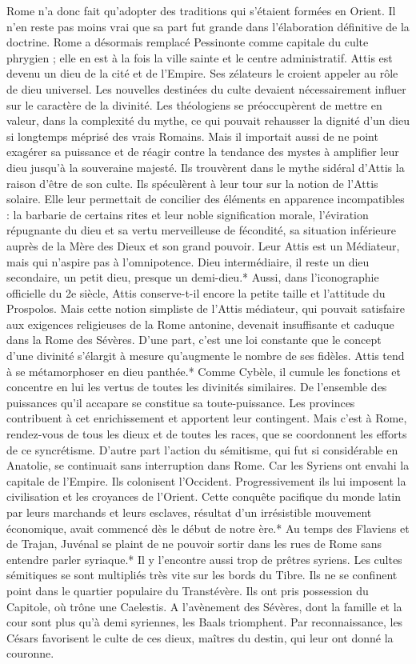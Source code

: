 \documentclass[a4paper, 11pt, oneside, polutonikogreek, french]{article}
\begin{document}
Rome n'a donc fait qu'adopter des traditions qui s'étaient formées en Orient. Il n'en reste pas moins vrai que sa part fut grande dans l'élaboration définitive de la doctrine. Rome a désormais remplacé Pessinonte comme capitale du culte phrygien ; elle en est à la fois la ville sainte et le centre administratif. Attis est devenu un dieu de la cité et de l'Empire. Ses zélateurs le croient appeler au rôle de dieu universel. Les nouvelles destinées du culte devaient nécessairement influer sur le caractère de la divinité. Les théologiens se préoccupèrent de mettre en valeur, dans la complexité du mythe, ce qui pouvait rehausser la dignité d'un dieu si longtemps méprisé des vrais Romains. Mais il importait aussi de ne point exagérer sa puissance et de réagir contre la tendance des mystes à amplifier leur dieu jusqu'à la souveraine majesté. Ils trouvèrent dans le mythe sidéral d'Attis la raison d'être de son culte. Ils spéculèrent à leur tour sur la notion de l'Attis solaire. Elle leur permettait de concilier des éléments en apparence incompatibles : la barbarie de certains rites et leur noble signification morale, l'éviration répugnante du dieu et sa vertu merveilleuse de fécondité, sa situation inférieure auprès de la Mère des Dieux et son grand pouvoir. Leur Attis est un Médiateur, mais qui n'aspire pas à l'omnipotence. Dieu intermédiaire, il reste un dieu secondaire, un petit dieu, presque un demi-dieu.* Aussi, dans l'iconographie officielle du 2e siècle, Attis conserve-t-il encore la petite taille et l'attitude du Prospolos. Mais cette notion simpliste de l'Attis médiateur, qui pouvait satisfaire aux exigences religieuses de la Rome antonine, devenait insuffisante et caduque dans la Rome des Sévères. D'une part, c'est une loi constante que le concept d'une divinité s'élargit à mesure qu'augmente le nombre de ses fidèles. Attis tend à se métamorphoser en dieu panthée.* Comme Cybèle, il cumule les fonctions et concentre en lui les vertus de toutes les divinités similaires. De l'ensemble des puissances qu'il accapare se constitue sa toute-puissance. Les provinces contribuent à cet enrichissement et apportent leur contingent. Mais c'est à Rome, rendez-vous de tous les dieux et de toutes les races, que se coordonnent les efforts de ce syncrétisme. D'autre part l'action du sémitisme, qui fut si considérable en Anatolie, se continuait sans interruption dans Rome. Car les Syriens ont envahi la capitale de l'Empire. Ils colonisent l'Occident. Progressivement ils lui imposent la civilisation et les croyances de l'Orient. Cette conquête pacifique du monde latin par leurs marchands et leurs esclaves, résultat d'un irrésistible mouvement économique, avait commencé dès le début de notre ère.* Au temps des Flaviens et de Trajan, Juvénal se plaint de ne pouvoir sortir dans les rues de Rome sans entendre parler syriaque.* Il y l'encontre aussi trop de prêtres syriens. Les cultes sémitiques se sont multipliés très vite sur les bords du Tibre. Ils ne se confinent point dans le quartier populaire du Transtévère. Ils ont pris possession du Capitole, où trône une Caelestis. A l'avènement des Sévères, dont la famille et la cour sont plus qu'à demi syriennes, les Baals triomphent. Par reconnaissance, les Césars favorisent le culte de ces dieux, maîtres du destin, qui leur ont donné la couronne. 
\end{document}

